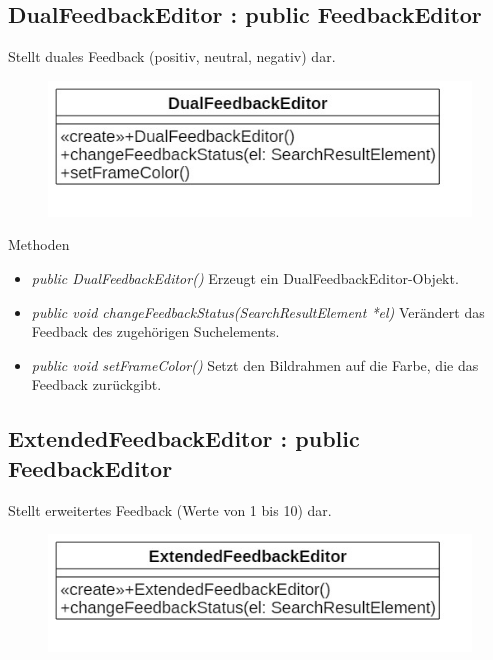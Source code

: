 \subsection*{DualFeedbackEditor : public FeedbackEditor}
Stellt duales Feedback (positiv, neutral, negativ) dar.

\begin{figure}[H]
	\centering
	\includegraphics[scale=0.5]{img/Klassendiagramm/Klassen/View/DualFeedbackEditor}
	\label{fig:dualFeedbackEditor}
\end{figure}

Methoden
\begin{itemize}
	\item\textit{public DualFeedbackEditor()}
	Erzeugt ein DualFeedbackEditor-Objekt.
	\item\textit{public void changeFeedbackStatus(SearchResultElement *el)}
	Verändert das Feedback des zugehörigen Suchelements.
	\item\textit{public void setFrameColor()}
	Setzt den Bildrahmen auf die Farbe, die das Feedback zurückgibt. 
\end{itemize}

\subsection*{ExtendedFeedbackEditor : public FeedbackEditor}
Stellt erweitertes Feedback (Werte von 1 bis 10) dar.

\begin{figure}[H]
	\centering
	\includegraphics[scale=0.5]{img/Klassendiagramm/Klassen/View/ExtendedFeedbackEditor}
	\label{fig:ExtendedFeedbackEditor}
\end{figure}


